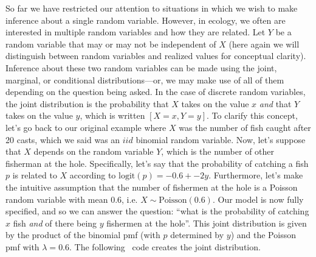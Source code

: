 So far we have restricted our attention to situations in which we wish
to make inference about a single random variable.
However, in ecology, we often are interested in multiple random
variables and how they are related.
Let $Y$ be a random variable
that may or may not be independent of $X$ (here again we will
distinguish between random variables and realized values for
conceptual clarity). Inference
about these two random variables can be made using the joint,
marginal, or conditional distributions---or, we may make use of all of
them depending on the question being asked. In the case of
discrete random variables, the joint
distribution is the probability that $X$ takes on the value $x$
\textit{and} that $Y$ takes on the value $y$, which is written
$[X=x,Y=y]$. To clarify this concept, let's go back to our original
example where $X$ was the number of fish caught after 20 casts, which
we said was an $iid$
binomial random variable. Now,
let's suppose that $X$ depends on the random variable $Y$, which is
the number of other fisherman at the hole. Specifically, let's say
that the probability of catching a fish $p$ is related to $X$
according to $\text{logit}(p) = -0.6 + -2y$. Furthermore, let's
make the intuitive assumption that the number of fishermen at the hole
is a Poisson random variable with mean $0.6$, i.e. $X \sim
\text{Poisson}(0.6)$. Our model is now fully specified, and so we can
answer the question: ``what is the probability of catching $x$ fish
\textit{and} of there being $y$ fishermen at the hole''. This joint
distribution is given by the product of the binomial pmf (with $p$
determined by $y$) and the Poisson pmf with $\lambda=0.6$. The
following \R~code creates the joint distribution.
